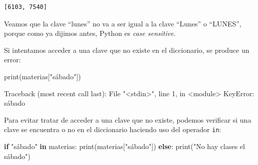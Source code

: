 \documentclass[
  letterpaper,
  DIV=11,
  numbers=noendperiod]{scrreprt}
\newenvironment{Shaded}{\begin{snugshade}}{\end{snugshade}}
\newcommand{\BuiltInTok}[1]{\textcolor[rgb]{0.00,0.23,0.31}{#1}}
\newcommand{\ControlFlowTok}[1]{\textcolor[rgb]{0.00,0.23,0.31}{\textbf{#1}}}
\newcommand{\KeywordTok}[1]{\textcolor[rgb]{0.00,0.23,0.31}{\textbf{#1}}}
\newcommand{\NormalTok}[1]{\textcolor[rgb]{0.00,0.23,0.31}{#1}}
\newcommand{\StringTok}[1]{\textcolor[rgb]{0.13,0.47,0.30}{#1}}
\begin{document}
\begin{verbatim}
[6103, 7540]
\end{verbatim}

Veamos que la clave ``lunes'' no va a ser igual a la clave ``Lunes'' o
``LUNES'', porque como ya dijimos antes, Python es \emph{case
sensitive}.

\begin{tcolorbox}[enhanced jigsaw, arc=.35mm, toptitle=1mm, colframe=quarto-callout-warning-color-frame, bottomtitle=1mm, opacitybacktitle=0.6, colbacktitle=quarto-callout-warning-color!10!white, leftrule=.75mm, coltitle=black, toprule=.15mm, titlerule=0mm, title=\textcolor{quarto-callout-warning-color}{\faExclamationTriangle}\hspace{0.5em}{¡Cuidado! Acceso a Claves que no Existen}, bottomrule=.15mm, rightrule=.15mm, colback=white, breakable, opacityback=0, left=2mm]

Si intentamos acceder a una clave que no existe en el diccionario, se
produce un error:

\begin{Shaded}
\begin{Highlighting}[]
\BuiltInTok{print}\NormalTok{(materias[}\StringTok{"sábado"}\NormalTok{])}
\end{Highlighting}
\end{Shaded}

\begin{Shaded}
\begin{Highlighting}[]
\NormalTok{Traceback (most recent call last):}
\NormalTok{File "\textless{}stdin\textgreater{}", line 1, in \textless{}module\textgreater{}}
\NormalTok{KeyError: \textquotesingle{}sábado\textquotesingle{}}
\end{Highlighting}
\end{Shaded}

\end{tcolorbox}

\hfill\break
Para evitar tratar de acceder a una clave que no existe, podemos
verificar si una clave se encuentra o no en el diccionario haciendo uso
del operador \texttt{in}:

\begin{Shaded}
\begin{Highlighting}[]
\ControlFlowTok{if} \StringTok{"sábado"} \KeywordTok{in}\NormalTok{ materias:}
    \BuiltInTok{print}\NormalTok{(materias[}\StringTok{"sábado"}\NormalTok{])}
\ControlFlowTok{else}\NormalTok{:}
    \BuiltInTok{print}\NormalTok{(}\StringTok{"No hay clases el sábado"}\NormalTok{)}
\end{Highlighting}
\end{Shaded}
\end{document}
